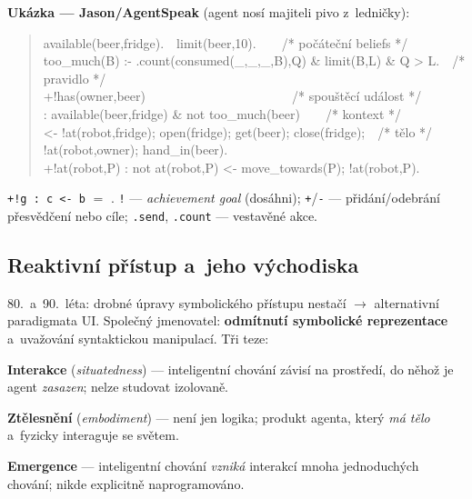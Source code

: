 \documentclass[11pt,a4paper]{article}
\theoremstyle{definition}
\begin{document}
\medskip
\noindent\textbf{Ukázka --- Jason/AgentSpeak} (agent nosí majiteli pivo z~ledničky):
\begin{quote}\small\ttfamily
\noindent available(beer,fridge).\ \ limit(beer,10).\ \ \ \ /* počáteční beliefs */\\
too\_much(B) :- .count(consumed(\_,\_,\_,B),Q) \& limit(B,L) \& Q > L.\ \ /* pravidlo */\\[0.3em]
+!has(owner,beer)\ \ \ \ \ \ \ \ \ \ \ \ \ \ \ \ \ \ \ \ \ \ \ /* spouštěcí událost */\\
\hspace*{1em}: available(beer,fridge) \& not too\_much(beer)\ \ \ \ /* kontext */\\
\hspace*{1em}<- !at(robot,fridge); open(fridge); get(beer); close(fridge);\ \ /* tělo */\\
\hspace*{2em} !at(robot,owner); hand\_in(beer).\\[0.3em]
+!at(robot,P) : not at(robot,P) <- move\_towards(P); !at(robot,P).
\end{quote}
\texttt{+!g : c <- b} $=$ . \texttt{!} --- \emph{achievement goal} (dosáhni);
\texttt{+}/\texttt{-} --- přidání/odebrání přesvědčení nebo cíle; \texttt{.send}, \texttt{.count}
--- vestavěné akce.

\subsection{Reaktivní přístup a~jeho východiska}

80.\ a~90.\ léta: drobné úpravy symbolického přístupu nestačí $\to$ alternativní paradigmata UI.
Společný jmenovatel: \textbf{odmítnutí symbolické reprezentace} a~uvažování syntaktickou
manipulací. Tři teze:

\begin{defbox}
\textbf{Interakce} (\emph{situatedness}) --- inteligentní chování závisí na prostředí, do něhož
je agent \emph{zasazen}; nelze studovat izolovaně.

\textbf{Ztělesnění} (\emph{embodiment}) --- není jen logika; produkt agenta, který \emph{má tělo}
a~fyzicky interaguje se světem.

\textbf{Emergence} --- inteligentní chování \emph{vzniká} interakcí mnoha jednoduchých chování;
nikde explicitně naprogramováno.
\end{defbox}
\end{document}
